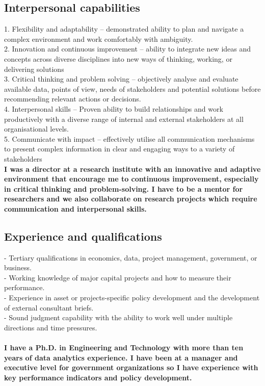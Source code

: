 \documentclass[12pt]{article}
\begin{document}
\subsection*{Interpersonal capabilities}
1.	Flexibility and adaptability – demonstrated ability to plan and navigate a complex environment and work comfortably with ambiguity.
\\2.	Innovation and continuous improvement – ability to integrate new ideas and concepts across diverse disciplines into new ways of thinking, working, or delivering solutions
\\3.	Critical thinking and problem solving – objectively analyse and evaluate available data, points of view, needs of stakeholders and potential solutions before recommending relevant actions or decisions.
\\4.	Interpersonal skills – Proven ability to build relationships and work productively with a diverse range of internal and external stakeholders at all organisational levels.
\\5.	Communicate with impact – effectively utilise all communication mechanisms to present complex information in clear and engaging ways to a variety of stakeholders
{\bfseries \\I was a director at a research institute with an innovative and adaptive environment that encourage me to continuous improvement, especially in critical thinking and problem-solving. I have to be a mentor for researchers and we also collaborate on research projects which require communication and interpersonal skills.}

\subsection*{Experience and qualifications}
-	Tertiary qualifications in economics, data, project management, government, or business.
\\-	Working knowledge of major capital projects and how to measure their performance.
\\-	Experience in asset or projects-specific policy development and the development of external consultant briefs.
\\-	Sound judgment capability with the ability to work well under multiple directions and time pressures.\\
{\bfseries \\I have a Ph.D. in Engineering and Technology with more than ten years of data analytics experience. I have been at a manager and executive level for government organizations so I have experience with key performance indicators and policy development.}
\end{document}
